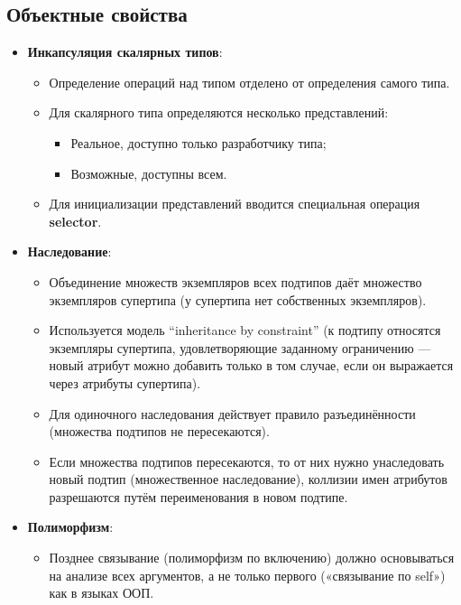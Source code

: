 \documentclass[a4paper,12pt]{article}
\begin{document}
\subsection{Объектные свойства}

\begin{itemize}
    \item \textbf{Инкапсуляция скалярных типов}:
    \begin{itemize}
        \item Определение операций над типом отделено от определения самого типа.
        \item Для скалярного типа определяются несколько представлений:
        \begin{itemize}
            \item Реальное, доступно только разработчику типа;
            \item Возможные, доступны всем.
        \end{itemize}
        \item Для инициализации представлений вводится специальная операция \textbf{selector}.
    \end{itemize}
    
    \item \textbf{Наследование}:
    \begin{itemize}
        \item Объединение множеств экземпляров всех подтипов даёт множество экземпляров супертипа (у супертипа нет собственных экземпляров).
        \item Используется модель “inheritance by constraint” (к подтипу относятся экземпляры супертипа, удовлетворяющие заданному ограничению --- новый атрибут можно добавить только в том случае, если он выражается через атрибуты супертипа).
        \item Для одиночного наследования действует правило разъединённости (множества подтипов не пересекаются).
        \item Если множества подтипов пересекаются, то от них нужно унаследовать новый подтип (множественное наследование), коллизии имен атрибутов разрешаются путём переименования в новом подтипе.
    \end{itemize}
    
    \item \textbf{Полиморфизм}:
    \begin{itemize}
        \item Позднее связывание (полиморфизм по включению) должно основываться на анализе всех аргументов, а не только первого («связывание по self») как в языках ООП.
    \end{itemize}
\end{itemize}
\end{document}
